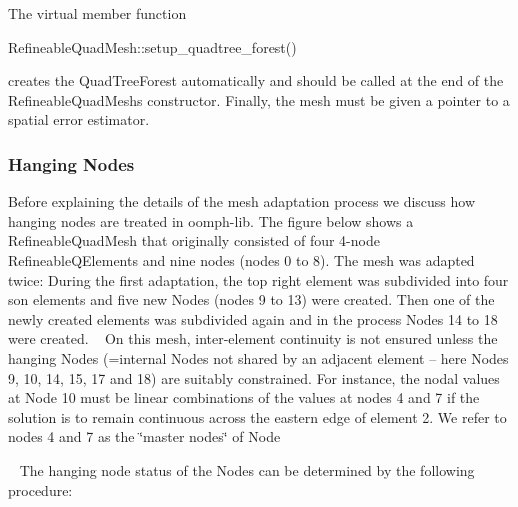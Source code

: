 The virtual member function 
\begin{DoxyCode}
RefineableQuadMesh::setup\_quadtree\_forest() 
\end{DoxyCode}
 creates the {\ttfamily Quad\+Tree\+Forest} automatically and should be called at the end of the {\ttfamily Refineable\+Quad\+Mesh\textquotesingle{}s} constructor. Finally, the mesh must be given a pointer to a spatial error estimator.\hypertarget{index_Hanging_Nodes}{}\subsubsection{Hanging Nodes}\label{index_Hanging_Nodes}
Before explaining the details of the mesh adaptation process we discuss how hanging nodes are treated in {\ttfamily oomph-\/lib}. The figure below shows a {\ttfamily Refineable\+Quad\+Mesh} that originally consisted of four 4-\/node {\ttfamily Refineable\+Q\+Elements} and nine nodes (nodes 0 to 8). The mesh was adapted twice\+: During the first adaptation, the top right element was subdivided into four son elements and five new {\ttfamily Nodes} (nodes 9 to 13) were created. Then one of the newly created elements was subdivided again and in the process {\ttfamily Nodes} 14 to 18 were created. ~\newline
 On this mesh, inter-\/element continuity is not ensured unless the hanging {\ttfamily Nodes} (=internal {\ttfamily Nodes} not shared by an adjacent element -- here {\ttfamily Nodes} 9, 10, 14, 15, 17 and 18) are suitably constrained. For instance, the nodal values at {\ttfamily Node} 10 must be linear combinations of the values at nodes 4 and 7 if the solution is to remain continuous across the eastern edge of element 2. We refer to nodes 4 and 7 as the \char`\"{}master nodes\char`\"{} of {\ttfamily Node} 
\begin{DoxyEnumerate}
\item ~\newline
 The hanging node status of the {\ttfamily Nodes} can be determined by the following procedure\+:
\end{DoxyEnumerate}
